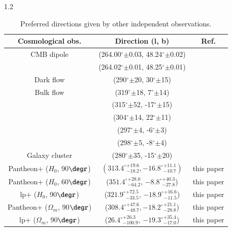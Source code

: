 \documentclass{aa}
\begin{document}
\begin{table}\footnotesize
        \caption{Preferred directions given by other independent observations. \label{T2}}
        \centering
        \begin{spacing}{1.2}
                \begin{tabular}{ccc}
                        \hline\hline
                        Cosmological obs. & Direction (l, b)  & Ref.  \\
                        \hline
                        CMB dipole & (264.00$^{\circ}$$\pm$0.03, 48.24$^{\circ}$$\pm$0.02)  & \citep{2016AA...594A...1P} \\
                        & (264.02$^{\circ}$$\pm$0.01, 48.25$^{\circ}$$\pm$0.01)  & \citep{2020AA...641A...1P} \\
                        Dark flow  &(290$^{\circ}$$\pm$20, 30$^{\circ}$$\pm$15)  & \citep{2022JHEAp..34...49A} \\
                        Bulk flow  & (319$^{\circ}$$\pm$18, 7$^{\circ}$$\pm$14)  & \citep{2012MNRAS.420..447T} \\
                        & (315$^{\circ}$$\pm$52, -17$^{\circ}$$\pm$15)  & \citep{2017MNRAS.468.1420F} \\
                        & (304$^{\circ}$$\pm$14, 22$^{\circ}$$\pm$11)  & \citep{2017MNRAS.468.1420F} \\
                        & (297$^{\circ}$$\pm$4, -6$^{\circ}$$\pm$3)  & \citep{2023MNRAS.524.1885W} \\
                        & (298$^{\circ}$$\pm$5, -8$^{\circ}$$\pm$4)  & \citep{2023MNRAS.524.1885W} \\                 
                        Galaxy cluster & (280$^{\circ}$$\pm$35, -15$^{\circ}$$\pm$20)  & \citep{2021AA...649A.151M} \\
                        Pantheon+ ($H_{0}$, 90$\degr$) & $({313.4^{\circ}}_{-18.2}^{+19.6}, {-16.8^{\circ}}_{-10.7}^{+11.1})$  & this paper \\
                        Pantheon+ ($H_{0}$, 60$\degr$) & (${351.4^{\circ}}_{-64.2}^{+28.0}$, ${-8.8^{\circ}}_{-27.8}^{+40.3}$)  & this paper \\
                        lp+ ($H_{0}$, 90$\degr$) & (${321.9^{\circ}}_{-33.5}^{+72.5}$, ${-18.9^{\circ}}_{-11.5}^{+16.6}$)  & this paper \\
                        Pantheon+ ($\Omega_{m}$, 90$\degr$) & (${308.4^{\circ}}_{-48.7}^{+47.6}, {-18.2^{\circ}}_{-28.8}^{+21.1}$)  & this paper \\
                        lp+ ($\Omega_{m}$, 90$\degr$) & (${26.4^{\circ}}_{-100.9}^{+26.3}$, ${-19.3^{\circ}}_{-17.0}^{+35.4}$)  & this paper \\
                       
                        
                        
                        \hline\hline
                \end{tabular}
        \end{spacing}
\end{table}
\end{document}
